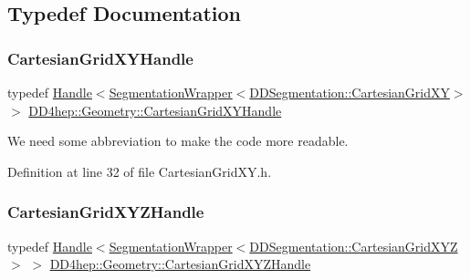 \subsection{Typedef Documentation}
\hypertarget{namespace_d_d4hep_1_1_geometry_a3d6ee3d4ad1e20c15b726ca41f8f3b59}{}\label{namespace_d_d4hep_1_1_geometry_a3d6ee3d4ad1e20c15b726ca41f8f3b59} 
\subsubsection{\texorpdfstring{Cartesian\+Grid\+X\+Y\+Handle}{CartesianGridXYHandle}}
{\footnotesize\ttfamily typedef \hyperlink{class_d_d4hep_1_1_handle}{Handle}$<$\hyperlink{class_d_d4hep_1_1_geometry_1_1_segmentation_wrapper}{Segmentation\+Wrapper}$<$\hyperlink{class_d_d4hep_1_1_d_d_segmentation_1_1_cartesian_grid_x_y}{D\+D\+Segmentation\+::\+Cartesian\+Grid\+XY}$>$ $>$ \hyperlink{namespace_d_d4hep_1_1_geometry_a3d6ee3d4ad1e20c15b726ca41f8f3b59}{D\+D4hep\+::\+Geometry\+::\+Cartesian\+Grid\+X\+Y\+Handle}}



We need some abbreviation to make the code more readable. 



Definition at line 32 of file Cartesian\+Grid\+X\+Y.\+h.

\hypertarget{namespace_d_d4hep_1_1_geometry_ae299410d519f2026e72fd36ea6967324}{}\label{namespace_d_d4hep_1_1_geometry_ae299410d519f2026e72fd36ea6967324} 
\subsubsection{\texorpdfstring{Cartesian\+Grid\+X\+Y\+Z\+Handle}{CartesianGridXYZHandle}}
{\footnotesize\ttfamily typedef \hyperlink{class_d_d4hep_1_1_handle}{Handle}$<$\hyperlink{class_d_d4hep_1_1_geometry_1_1_segmentation_wrapper}{Segmentation\+Wrapper}$<$\hyperlink{class_d_d4hep_1_1_d_d_segmentation_1_1_cartesian_grid_x_y_z}{D\+D\+Segmentation\+::\+Cartesian\+Grid\+X\+YZ}$>$ $>$ \hyperlink{namespace_d_d4hep_1_1_geometry_ae299410d519f2026e72fd36ea6967324}{D\+D4hep\+::\+Geometry\+::\+Cartesian\+Grid\+X\+Y\+Z\+Handle}}



